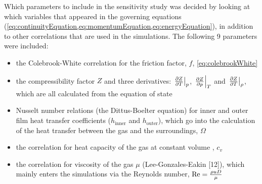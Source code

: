 Which parameters to include in the sensitivity study was decided by looking at which variables that appeared in the governing equations (\cref{eq:continuityEquation,eq:momentumEquation,eq:energyEquation}), in addition to other correlations that are used in the simulations. The following 9 parameters were included:
\begin{itemize}
    \item the Colebrook-White correlation for the friction factor, $f$, \cref{eq:colebrookWhite}
    
    \item the compressibility factor $Z$ and three derivatives: $\eval{\pd{Z}{T}}_p$, $\eval{\pd{Z}{p}}_T$ and $\eval{\pd{Z}{T}}_\rho$, which are all calculated from the equation of state
    
    \item Nusselt number relations (the Dittus-Boelter equation) for inner and outer film heat transfer coefficients ($h_\text{inner}$ and $h_\text{outer}$), which go into the calculation of the heat transfer between the gas and the surroundings, $\Omega$
    
    \item the correlation for heat capacity of the gas at constant volume%
    , $c_v$
    
    \item the correlation for viscosity of the gas $\mu$ (Lee-Gonzales-Eakin [12]), which mainly enters the simulations via the Reynolds number, $\operatorname{R\kern-.04em e} = \frac{\rho u D}{\mu}$
 \end{itemize}




